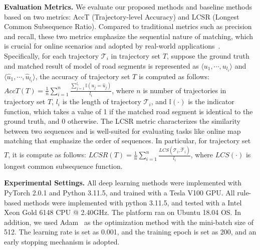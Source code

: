 \noindent \textbf{Evaluation Metrics.} We evaluate our proposed methods and baseline methods based on two metrics: AccT (Trajectory-level Accuracy) and LCSR (Longest Common Subsequence Ratio). Compared to traditional metrics such as precision and recall, these two metrics emphasize the sequential nature of matching, which is crucial for online scenarios and adopted by real-world applications~\cite{graphmm}. 
Specifically, for each trajectory $\mathcal{T}_i$ in trajectory set $T$, suppose the ground truth and matched result of model of road segments is represented as $\langle u_{1}, \cdots, u_{l_i} \rangle$ and $\langle \hat{u}_{1}, \cdots, \hat{u}_{l_i} \rangle$, the accuracy of trajectory set $T$ is computed as follows: $AccT(T) = \frac{1}{n}\sum_{i=1}^{n}\frac{\sum_{j=1}^{l_i}\mathbb{I}(u_j=\hat{u}_j)}{l_i}$, where $n$ is number of trajectories in trajectory set $T$, $l_i$ is the length of trajectory $\mathcal{T}_i$, and $\mathbb{I}(\cdot)$ is the indicator function, which takes a value of 1 if the matched road segment is identical to the ground truth, and 0 otherwise.
The LCSR metric characterizes the similarity between two sequences and is well-suited for evaluating tasks like online map matching that emphasize the order of sequences. In particular, for trajectory set $T$, it is compute as follows: $LCSR(T) = \frac{1}{n}\sum_{i=1}^{n}\frac{LCS(\mathcal{T}_i, \hat{\mathcal{T}}_i)}{l_i}$, where $LCS(\cdot)$ is longest common subsequence function.

\noindent \textbf{Experimental Settings.} All deep learning methods were implemented with PyTorch 2.0.1 and Python 3.11.5, and trained with a Tesla V100 GPU. All rule-based methods were implemented with python 3.11.5, and tested with a Intel Xeon Gold 6148 CPU @ 2.40GHz. The platform ran on Ubuntu 18.04 OS. In addition, we used Adam~\cite{adam} as the optimization method with the mini-batch size of 512. The learning rate is set as 0.001, and the training epoch is set as 200, and an early stopping mechanism is adopted.

